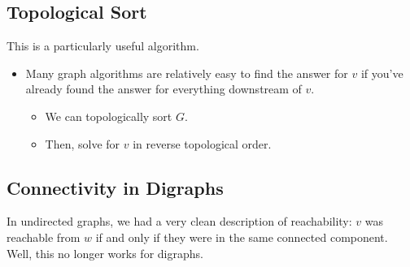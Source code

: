 \documentclass[letterpaper]{article}
\begin{document}
\subsection{Topological Sort}
This is a particularly useful algorithm. 
\begin{itemize}
    \item Many graph algorithms are relatively easy to find the answer for $v$ if you've already found the answer for everything downstream of $v$. 
    \begin{itemize}
        \item We can topologically sort $G$. 
        \item Then, solve for $v$ in reverse topological order.
    \end{itemize}
\end{itemize}

\subsection{Connectivity in Digraphs}
In undirected graphs, we had a very clean description of reachability: $v$ was reachable from $w$ if and only if they were in the same connected component. Well, this no longer works for digraphs. 
\end{document}
